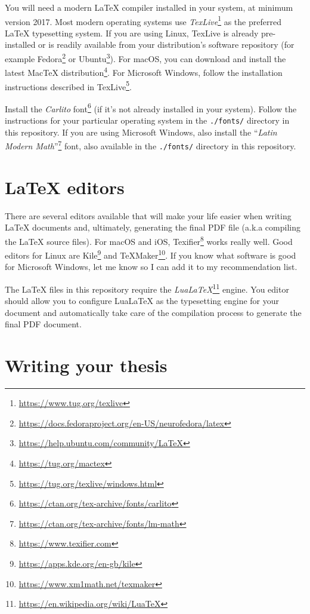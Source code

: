 You will need a modern LaTeX compiler installed in your system, at minimum version 2017. Most modern operating systems use \textit{TexLive}\footnote{\url{https://www.tug.org/texlive}} as the preferred LaTeX typesetting system. If you are using Linux, TexLive is already pre-installed or is readily available from your distribution's software repository (for example Fedora\footnote{\url{https://docs.fedoraproject.org/en-US/neurofedora/latex}} or Ubuntu\footnote{\url{https://help.ubuntu.com/community/LaTeX}}). For macOS, you can download and install the latest MacTeX distribution\footnote{\url{https://tug.org/mactex}}. For Microsoft Windows, follow the installation instructions described in TexLive\footnote{\url{https://tug.org/texlive/windows.html}}.

Install the \textit{Carlito} font\footnote{\url{https://ctan.org/tex-archive/fonts/carlito}} (if it's not already installed in your system). Follow the instructions for your particular operating system in the \verb|./fonts/| directory in this repository. If you are using Microsoft Windows, also install the ``\textit{Latin Modern Math}''\footnote{\url{https://ctan.org/tex-archive/fonts/lm-math}} font, also available in the \verb|./fonts/| directory in this repository.


\section{LaTeX editors}


There are several editors available that will make your life easier when writing LaTeX documents and, ultimately, generating the final PDF file (a.k.a compiling the LaTeX source files). For macOS and iOS, Texifier\footnote{\url{https://www.texifier.com}} works really well. Good editors for Linux are Kile\footnote{\url{https://apps.kde.org/en-gb/kile}} and TeXMaker\footnote{\url{https://www.xm1math.net/texmaker}}. If you know what software is good for Microsoft Windows, let me know so I can add it to my recommendation list.

The LaTeX files in this repository require the \textit{LuaLaTeX}\footnote{\url{https://en.wikipedia.org/wiki/LuaTeX}} engine. You editor should allow you to configure LuaLaTeX as the typesetting engine for your document and automatically take care of the compilation process to generate the final PDF document.


\section{Writing your thesis}


